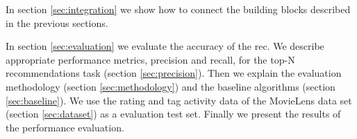 In section \ref{sec:integration} we show how to connect the building blocks described in the previous sections.

In section \ref{sec:evaluation} we evaluate the accuracy of the \gls{rec}. We describe appropriate performance metrics, \gls{precision} and \gls{recall}, for the top-N recommendations task (section \ref{sec:precision}). 
Then we explain the evaluation methodology (section \ref{sec:methodology}) and the baseline algorithms (section \ref{sec:baseline}). 
We use the rating and tag activity data of the MovieLens data set (section \ref{sec:dataset}) as a evaluation test set. 
Finally we present the results of the performance evaluation. 